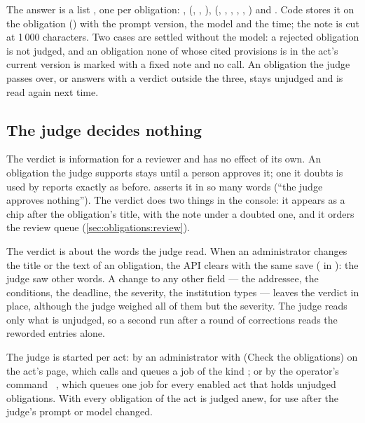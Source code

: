 The answer is a list , one per obligation: , 
(, , ),  (,
, , , , ) and
. Code stores it on the obligation () with the
prompt version, the model and the time; the note is cut at 1\,000 characters. Two cases
are settled without the model: a rejected obligation is not judged, and an obligation none
of whose cited provisions is in the act's current version is marked  with
a fixed note and no call. An obligation the judge passes over, or answers with a verdict
outside the three, stays unjudged and is read again next time.

\subsection{The judge decides nothing}

The verdict is information for a reviewer and has no effect of its own. An obligation the
judge supports stays  until a person approves it; one it doubts is used by
reports exactly as before.  asserts it in so many
words (\enquote{the judge approves nothing}). The verdict does two things in the console: it
appears as a chip after the obligation's title, with the note under a doubted one, and it
orders the review queue (\cref{sec:obligations:review}).

The verdict is about the words the judge read. When an administrator changes the title or
the text of an obligation, the API clears  with the same save
( in ): the judge saw other
words. A change to any other field --- the addressee, the conditions, the deadline, the
severity, the institution types --- leaves the verdict in place, although the judge weighed
all of them but the severity. The judge reads only what is unjudged, so a second run after a round of
corrections reads the reworded entries alone.

The judge is started per act: by an administrator with  (Check the
obligations) on the act's page, which calls
 and queues a job of the kind
; or by the operator's command
~, which queues one job for every enabled act that holds
unjudged obligations. With  every obligation of the act is judged anew, for use
after the judge's prompt or model changed.

